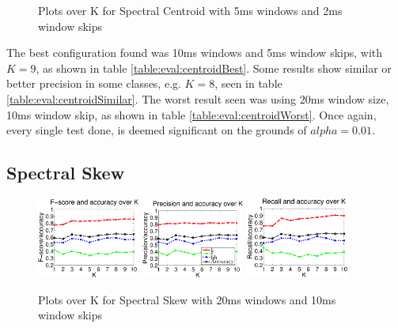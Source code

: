 {\begin{figure}
				\caption{Plots over K for Spectral Centroid with 5ms windows and 2ms window skips}
		\end{figure}\clearpage
		
		The best configuration found was 10ms windows and 5ms window skips, with $K=9$, as shown in table \ref{table:eval:centroidBest}. Some results show similar or better precision in some classes, e.g. $K=8$, seen in table \ref{table:eval:centroidSimilar}. The worst result seen was using 20ms window size, 10ms window skip, as shown in table \ref{table:eval:centroidWorst}.
		Once again, every single test done, is deemed significant on the grounds of $alpha=0.01$.
		
				
	\subsection{Spectral Skew}
			
		\begin{figure}
			\centering\includegraphics[width=0.3\textwidth]{tex/appendices/test/sskew2010FP.png}
			\centering\includegraphics[width=0.3\textwidth]{tex/appendices/test/sskew2010_P.png}
			\centering\includegraphics[width=0.3\textwidth]{tex/appendices/test/sskew2010_R.png}
			
			\caption{Plots over K for Spectral Skew with 20ms windows and 10ms window skips}
		\end{figure}
		
}
